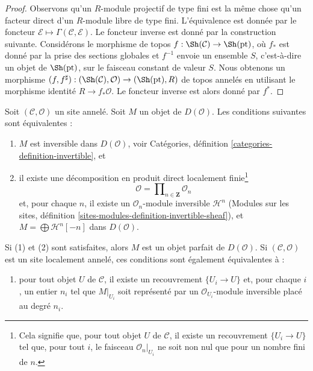 \begin{proof}
Observons qu'un $R$-module projectif de type fini est la même chose qu'un
facteur direct d'un $R$-module libre de type fini. L'équivalence est donnée
par le foncteur
$\mathcal{E} \mapsto \Gamma(\mathcal{C}, \mathcal{E})$. Le foncteur inverse
est donné par la construction suivante. Considérons le morphisme de topos
$f : \Sh(\mathcal{C}) \to \Sh(\text{pt})$, où $f_*$ est donné par la prise
des sections globales et $f^{-1}$ envoie un ensemble $S$, c'est-à-dire un
objet de $\Sh(\text{pt})$, sur le faisceau constant de valeur $S$. Nous
obtenons un morphisme
$(f, f^\sharp) : (\Sh(\mathcal{C}), \mathcal{O}) \to (\Sh(\text{pt}), R)$
de topos annelés en utilisant le morphisme identité $R \to f_*\mathcal{O}$.
Le foncteur inverse est alors donné par $f^*$.
\end{proof}

\begin{lemma}
\label{lemma-invertible-derived}
Soit $(\mathcal{C}, \mathcal{O})$ un site annelé. Soit $M$ un objet de
$D(\mathcal{O})$. Les conditions suivantes sont équivalentes :
\begin{enumerate}
\item $M$ est inversible dans $D(\mathcal{O})$, voir Catégories, définition
\ref{categories-definition-invertible}, et
\item il existe une décomposition en produit direct localement
finie\footnote{Cela signifie que, pour tout objet $U$ de $\mathcal{C}$, il
existe un recouvrement $\{U_i \to U\}$ tel que, pour tout $i$, le faisceau
$\mathcal{O}_n|_{U_i}$ ne soit non nul que pour un nombre fini de $n$.}
$$
\mathcal{O} = \prod\nolimits_{n \in \mathbf{Z}} \mathcal{O}_n
$$
et, pour chaque $n$, il existe un $\mathcal{O}_n$-module inversible
$\mathcal{H}^n$ (Modules sur les sites, définition
\ref{sites-modules-definition-invertible-sheaf}), et
$M = \bigoplus \mathcal{H}^n[-n]$ dans $D(\mathcal{O})$.
\end{enumerate}
Si (1) et (2) sont satisfaites, alors $M$ est un objet parfait de
$D(\mathcal{O})$. Si $(\mathcal{C}, \mathcal{O})$ est un site localement
annelé, ces conditions sont également équivalentes à :
\begin{enumerate}
\item[(3)] pour tout objet $U$ de $\mathcal{C}$, il existe un recouvrement
$\{U_i \to U\}$ et, pour chaque $i$, un entier $n_i$ tel que $M|_{U_i}$ soit
représenté par un $\mathcal{O}_{U_i}$-module inversible placé au degré $n_i$.
\end{enumerate}
\end{lemma}

